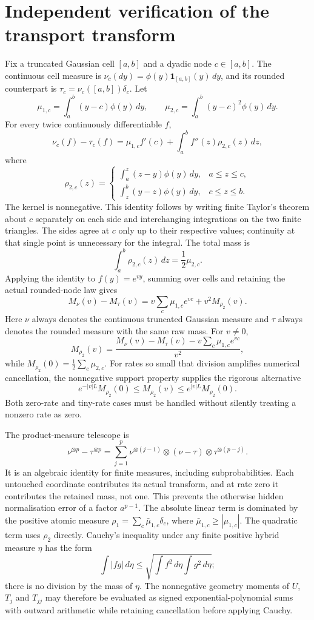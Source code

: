 \section{Independent verification of the transport transform}
Fix a truncated Gaussian cell $[a,b]$ and a dyadic node $c\in[a,b]$. The continuous cell measure is $\nu_c(dy)=\phi(y)\mathbf1_{[a,b]}(y)\,dy$, and its rounded counterpart is $\tau_c=\nu_c([a,b])\delta_c$. Let
\[
 \mu_{1,c}=\int_a^b(y-c)\phi(y)\,dy,
 \qquad \mu_{2,c}=\int_a^b(y-c)^2\phi(y)\,dy.
\]
For every twice continuously differentiable $f$,
\[
 \nu_c(f)-\tau_c(f)=\mu_{1,c}f'(c)+\int_a^b f''(z)\rho_{2,c}(z)\,dz,
\]
where
\[
 \rho_{2,c}(z)=\begin{cases}
 \int_a^z(z-y)\phi(y)\,dy,&a\leq z\leq c,\\
 \int_z^b(y-z)\phi(y)\,dy,&c\leq z\leq b.
 \end{cases}
\]
The kernel is nonnegative. This identity follows by writing finite Taylor's theorem about $c$ separately on each side and interchanging integrations on the two finite triangles. The sides agree at $c$ only up to their respective values; continuity at that single point is unnecessary for the integral. The total mass is
\[
 \int_a^b\rho_{2,c}(z)\,dz=\frac12\mu_{2,c}.
\]
Applying the identity to $f(y)=e^{vy}$, summing over cells and retaining the actual rounded-node law gives
\[
 M_{\nu}(v)-M_{\tau}(v)
 =v\sum_c\mu_{1,c}e^{vc}+v^2M_{\rho_2}(v).
\]
Here $\nu$ always denotes the continuous truncated Gaussian measure and $\tau$ always denotes the rounded measure with the same raw mass. For $v\ne0$,
\[
 M_{\rho_2}(v)=\frac{M_{\nu}(v)-M_{\tau}(v)-v\sum_c\mu_{1,c}e^{vc}}{v^2},
\]
while $M_{\rho_2}(0)=\frac12\sum_c\mu_{2,c}$. For rates so small that division amplifies numerical cancellation, the nonnegative support property supplies the rigorous alternative
\[
 e^{-|v|L}M_{\rho_2}(0)\leq M_{\rho_2}(v)\leq e^{|v|L}M_{\rho_2}(0).
\]
Both zero-rate and tiny-rate cases must be handled without silently treating a nonzero rate as zero.

The product-measure telescope is
\[
 \nu^{\otimes p}-\tau^{\otimes p}
 =\sum_{j=1}^{p}\nu^{\otimes(j-1)}\otimes(\nu-\tau)\otimes\tau^{\otimes(p-j)}.
\]
It is an algebraic identity for finite measures, including subprobabilities. Each untouched coordinate contributes its actual transform, and at rate zero it contributes the retained mass, not one. This prevents the otherwise hidden normalisation error of a factor $a^{p-1}$. The absolute linear term is dominated by the positive atomic measure $\rho_1=\sum_c \bar\mu_{1,c}\delta_c$, where $\bar\mu_{1,c}\geq|\mu_{1,c}|$. The quadratic term uses $\rho_2$ directly. Cauchy's inequality under any finite positive hybrid measure $\eta$ has the form
\[
 \int |fg|\,d\eta\leq\sqrt{\int f^2\,d\eta\int g^2\,d\eta};
\]
there is no division by the mass of $\eta$. The nonnegative geometry moments of $U$, $T_j$ and $T_{jj}$ may therefore be evaluated as signed exponential-polynomial sums with outward arithmetic while retaining cancellation before applying Cauchy.
